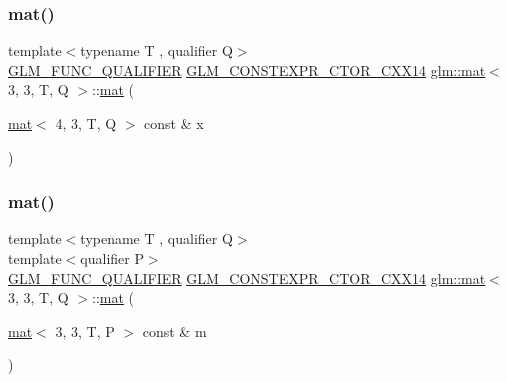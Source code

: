 \mbox{\label{structglm_1_1mat_3_013_00_013_00_01_t_00_01_q_01_4_aa085fc172fa309d9426e85ce0f278d36}} 
\subsubsection{\texorpdfstring{mat()}{mat()}\hspace{0.1cm}{\footnotesize\ttfamily [17/21]}}
{\footnotesize\ttfamily template$<$typename T , qualifier Q$>$ \\
\mbox{\hyperlink{setup_8hpp_a33fdea6f91c5f834105f7415e2a64407}{G\+L\+M\+\_\+\+F\+U\+N\+C\+\_\+\+Q\+U\+A\+L\+I\+F\+I\+ER}} \mbox{\hyperlink{setup_8hpp_a0900f9145e68bf6061b6f5e7be3fa751}{G\+L\+M\+\_\+\+C\+O\+N\+S\+T\+E\+X\+P\+R\+\_\+\+C\+T\+O\+R\+\_\+\+C\+X\+X14}} \mbox{\hyperlink{structglm_1_1mat}{glm\+::mat}}$<$ 3, 3, T, Q $>$\+::\mbox{\hyperlink{structglm_1_1mat}{mat}} (\begin{DoxyParamCaption}\item[{\mbox{\hyperlink{structglm_1_1mat}{mat}}$<$ 4, 3, T, Q $>$ const \&}]{x }\end{DoxyParamCaption})}

\mbox{\label{structglm_1_1mat_3_013_00_013_00_01_t_00_01_q_01_4_a58f5f32696916511bd3c65a06ddded18}} 
\subsubsection{\texorpdfstring{mat()}{mat()}\hspace{0.1cm}{\footnotesize\ttfamily [18/21]}}
{\footnotesize\ttfamily template$<$typename T , qualifier Q$>$ \\
template$<$qualifier P$>$ \\
\mbox{\hyperlink{setup_8hpp_a33fdea6f91c5f834105f7415e2a64407}{G\+L\+M\+\_\+\+F\+U\+N\+C\+\_\+\+Q\+U\+A\+L\+I\+F\+I\+ER}} \mbox{\hyperlink{setup_8hpp_a0900f9145e68bf6061b6f5e7be3fa751}{G\+L\+M\+\_\+\+C\+O\+N\+S\+T\+E\+X\+P\+R\+\_\+\+C\+T\+O\+R\+\_\+\+C\+X\+X14}} \mbox{\hyperlink{structglm_1_1mat}{glm\+::mat}}$<$ 3, 3, T, Q $>$\+::\mbox{\hyperlink{structglm_1_1mat}{mat}} (\begin{DoxyParamCaption}\item[{\mbox{\hyperlink{structglm_1_1mat}{mat}}$<$ 3, 3, T, P $>$ const \&}]{m }\end{DoxyParamCaption})}



